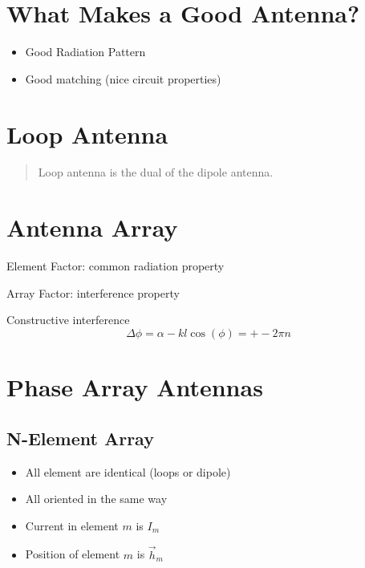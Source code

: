 \documentclass{article} %
\begin{document}
\section{What Makes a Good Antenna?}
\begin{itemize}
    \item Good Radiation Pattern
    \item Good matching (nice circuit properties)
\end{itemize}

\section{Loop Antenna}
\begin{quote}
    Loop antenna is the dual of the dipole antenna.
\end{quote}

\section{Antenna Array}

Element Factor: common radiation property

Array Factor: interference property

Constructive interference
\[\Delta \phi = \alpha - kl\cos(\phi) = +- 2\pi n\]


\section{Phase Array Antennas}
\subsection{N-Element Array}
\begin{itemize}
    \item All element are identical (loops or dipole)
    \item All oriented in the same way
    \item Current in element $m$ is $I_m$
    \item Position of element $m$ is $\vec{h}_m$
\end{itemize}
\end{document}
